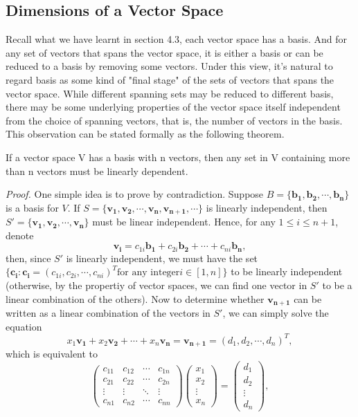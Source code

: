 \documentclass[10pt, a4paper]{article}
\newcommand{\vt}[1]{\mathbf{#1}}
\begin{document}
\subsection{Dimensions of a Vector Space}
Recall what we have learnt in section 4.3, each vector space has a basis. And for any set of vectors that spans the vector space, it is either a basis or can be reduced to a basis by removing some vectors.
Under this view, it's natural to regard basis as some kind of "final stage" of the sets of vectors that spans the vector space.
While different spanning sets may be reduced to different basis, there may be some underlying properties of the vector space itself independent from the choice of spanning vectors, that is, the number of vectors in the basis.
This observation can be stated formally as the following theorem.
\begin{proposition}
    If a vector space V has a basis with n vectors, then any set in V containing more than n vectors must be linearly dependent.
\end{proposition}
\indent\textit{Proof.} 
One simple idea is to prove by contradiction.
Suppose $B=\{\vt{b_1}, \vt{b_2}, \cdots, \vt{b_n}\}$ is a basis for $V$. If $S=\{\vt{v_1}, \vt{v_2}, \cdots, \vt{v_n}, \vt{v_{n+1}}, \cdots\}$ is linearly independent, then $S'=\{\vt{v_1}, \vt{v_2}, \cdots, \vt{v_n}\}$ must be linear independent.
Hence, for any $1\leq i\leq n+1$, denote \[
\vt{v_i} = c_{1i}\vt{b_1} + c_{2i}\vt{b_2} + \cdots + c_{ni}\vt{b_n},
\]
then, since $S'$ is linearly independent, we must have the set $\{\vt{c_i}:\vt{c_i}=(c_{1i}, c_{2i}, \cdots, c_{ni})^T \text{for any integer} i\in [1,n]\}$ to be linearly independent (otherwise, by the propertiy of vector spaces, we can find one vector in $S'$ to be a linear combination of the others).
Now to determine whether $\vt{v_{n+1}}$ can be written as a linear combination of the vectors in $S'$, we can simply solve the equation \[
x_1\vt{v_1} + x_2\vt{v_2} + \cdots + x_n\vt{v_n}=\vt{v_{n+1}} = (d_1, d_2, \cdots, d_n)^T,
\]
which is equivalent to \[
\begin{pmatrix}
    c_{11} & c_{12} & \cdots & c_{1n}\\
    c_{21} & c_{22} & \cdots & c_{2n}\\
    \vdots & \vdots & \ddots & \vdots\\
    c_{n1} & c_{n2} & \cdots & c_{nn}
\end{pmatrix}\begin{pmatrix}
    x_1\\x_2\\\vdots\\x_n
\end{pmatrix} = \begin{pmatrix}
    d_1\\d_2\\\vdots\\d_n
\end{pmatrix},
\]
\end{document}
